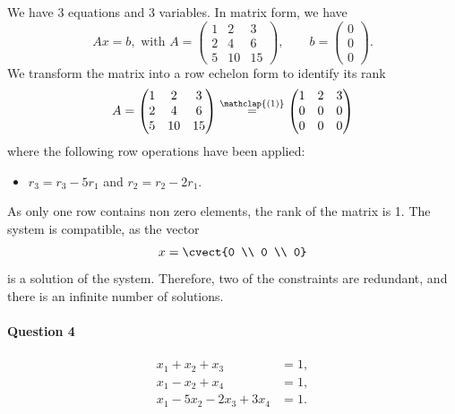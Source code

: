 We have 3 equations and 3 variables. In matrix form, we have
\[
Ax = b, \text{ with } A= \begin{pmatrix}
1&2&3\\ 2&4&6\\ 5&10&15
\end{pmatrix}, \qquad b = \begin{pmatrix}
0\\0\\0
\end{pmatrix}.
\]
We transform the matrix into a row echelon form to identify its rank
\[
A=
\begin{pmatrix}
  1 & 2 & 3 \\ 2 & 4 & 6 \\ 5 & 10 & 15 
\end{pmatrix}
\stackrel{\mathclap{(1)}}{=}
\begin{pmatrix}
  1 & 2 & 3 \\ 0 & 0 & 0 \\ 0 & 0 & 0 
\end{pmatrix}
\]
where the following row operations have been applied:
\begin{itemize}
\item[(1)] $r_3 = r_3 - 5r_1$ and $r_2=r_2-2r_1$.
\end{itemize}
As only one row contains non zero elements, the rank of the matrix is 1. 
The system is compatible, as the vector
\[
x=\cvect{0 \\ 0 \\ 0}
\]
is a solution of the system. Therefore, two of the constraints are
redundant, and there is an infinite number of solutions.

\paragraph*{Question 4}
\begin{align*}
x_1 + x_2 + x_3 &= 1,\\
x_1 - x_2 + x_4 &= 1, \\
x_1 -5x_2 -2x_3 +3x_4 &= 1.
\end{align*}

